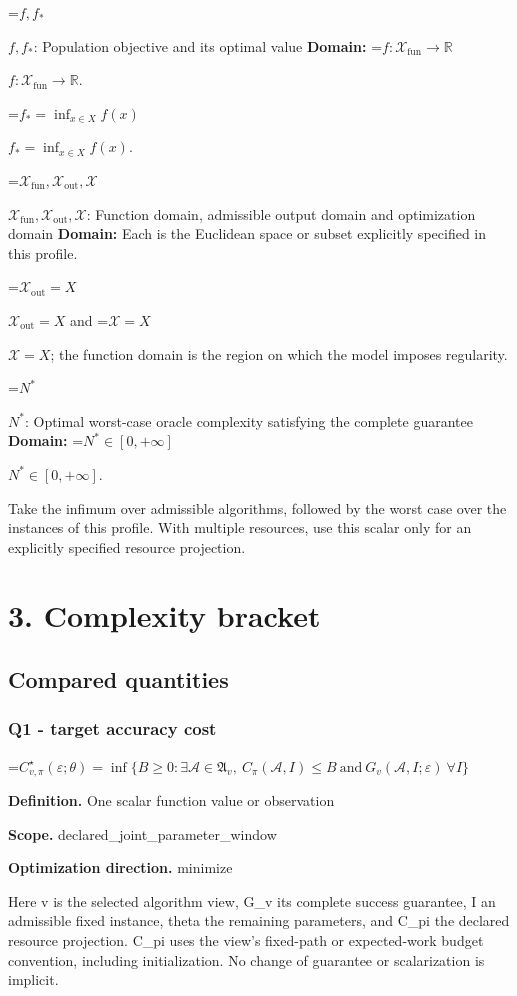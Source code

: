 \documentclass[10pt,a4paper]{article}
\newcommand{\AtlasMath}[1]{\par\begingroup\centering\setbox0=\hbox{$\displaystyle #1$}\ifdim\wd0>1.4\linewidth\typeout{ATLAS WIDE FORMULA: \the\wd0}\fi\ifdim\wd0>\linewidth\resizebox{\linewidth}{!}{\box0}\else\box0\fi\par\endgroup}
\newcommand{\AtlasInlineMath}[1]{\begingroup\setbox0=\hbox{$#1$}\ifdim\wd0>.4\linewidth\endgroup\AtlasMath{#1}\else\endgroup$#1$\fi}
\begin{document}
\AtlasInlineMath{f,f_*}: Population objective and its optimal value \textbf{Domain:} \AtlasInlineMath{f:\mathcal{X}_{\mathrm{fun}}\to\mathbb{R}}.

\AtlasInlineMath{f_*=\inf_{x\in X}f(x)}.

\AtlasInlineMath{\mathcal{X}_{\mathrm{fun}},\mathcal{X}_{\mathrm{out}},\mathcal{X}}: Function domain, admissible output domain and optimization domain \textbf{Domain:} Each is the Euclidean space or subset explicitly specified in this profile.

\AtlasInlineMath{\mathcal{X}_{\mathrm{out}}=X} and \AtlasInlineMath{\mathcal{X}=X}; the function domain is the region on which the model imposes regularity.

\AtlasInlineMath{N^*}: Optimal worst-case oracle complexity satisfying the complete guarantee \textbf{Domain:} \AtlasInlineMath{N^*\in[0,+\infty]}.

Take the infimum over admissible algorithms, followed by the worst case over the instances of this profile. With multiple resources, use this scalar only for an explicitly specified resource projection.

\section{3. Complexity bracket}
\subsection{Compared quantities}
\subsubsection{Q1 - target accuracy cost}
\AtlasMath{C^\star_{v,\pi}(\varepsilon;\theta)=\inf\{B\ge0:\exists\mathcal A\in\mathfrak A_v,\ C_\pi(\mathcal A,I)\le B\ \text{and}\ G_v(\mathcal A,I;\varepsilon)\ \forall I\}}
\textbf{Definition.} One scalar function value or observation

\textbf{Scope.} declared\_joint\_parameter\_window

\textbf{Optimization direction.} minimize

Here v is the selected algorithm view, G\_v its complete success guarantee, I an admissible fixed instance, theta the remaining parameters, and C\_pi the declared resource projection. C\_pi uses the view's fixed-path or expected-work budget convention, including initialization. No change of guarantee or scalarization is implicit.
\end{document}
